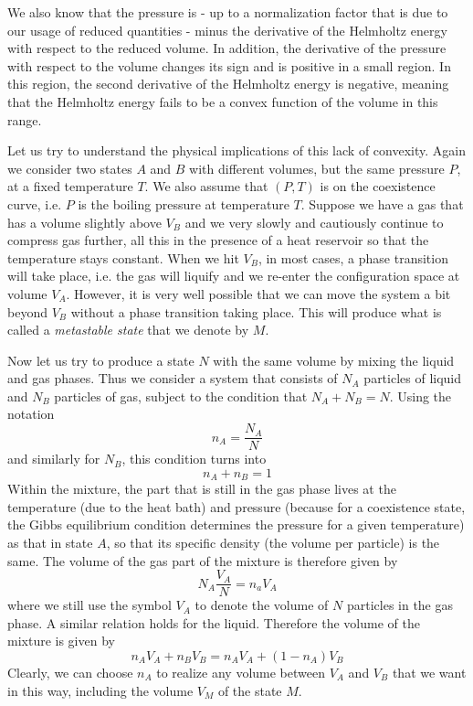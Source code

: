 \documentclass[a4paper, draft]{article}
\theoremstyle{own}
\theoremstyle{remark}
\begin{document}
We also know that the pressure is - up to a normalization factor that is due to our usage of reduced quantities - minus the derivative of the Helmholtz energy with respect to the reduced volume. In addition, the derivative of the pressure with respect to the volume changes its sign and is positive in a small region. In this region, the second derivative of the Helmholtz energy is negative, meaning that the Helmholtz energy fails to be a convex function of the volume in this range.

Let us try to understand the physical implications of this lack of convexity. Again we consider two states $A$ and $B$ with different volumes, but the same pressure $P$, at a fixed temperature $T$. We also assume that $(P, T)$ is on the coexistence curve, i.e. $P$ is the boiling pressure at temperature $T$. Suppose we have a gas that has a volume slightly above $V_B$ and we very slowly and cautiously continue to compress gas further, all this in the presence of a heat reservoir so that the temperature stays constant. When we hit $V_B$, in most cases, a phase transition will take place, i.e. the gas will liquify and we re-enter the configuration space at volume $V_A$. However, it is very well possible that we can move the system a bit beyond $V_B$  without a phase transition taking place. This will produce what is called a {\em metastable state} that we denote by $M$. 

Now let us try to produce a state $N$ with the same volume by mixing the liquid and gas phases. Thus we consider a system that consists of $N_A$ particles of liquid and $N_B$ particles of gas, subject to the condition that $N_A + N_B = N$. Using the notation
$$
n_A = \frac{N_A}{N}
$$ 
and similarly for $N_B$, this condition turns into 
$$
n_A + n_B = 1
$$
Within the mixture, the part that is still in the gas phase lives at the temperature (due to the heat bath) and pressure (because for a coexistence state, the Gibbs equilibrium condition determines the pressure for a given temperature) as that in state $A$, so that its specific density (the volume per particle) is the same. The volume of the gas part of the mixture is therefore given by 
$$
N_A\frac{V_A}{N}  = n_a V_A
$$
where we still use the symbol $V_A$ to denote the volume of $N$ particles in the gas phase. A similar relation holds for the liquid. Therefore the volume of the mixture is given by
$$
n_A V_A + n_B V_B = n_A V_A + (1 - n_A) V_B
$$
Clearly, we can choose $n_A$ to realize any volume between $V_A$ and $V_B$ that we want in this way, including the volume $V_M$ of the state $M$. 
\end{document}
